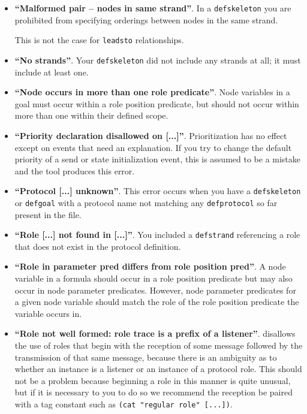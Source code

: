 \begin{itemize}
\item \textbf{``Malformed pair -- nodes in same strand''}.  In a \texttt{defskeleton}
  you are prohibited from specifying orderings between nodes in the same strand.

  This is not the case for \texttt{leadsto} relationships.

\item \textbf{``No strands''}.  Your \texttt{defskeleton} did not include
  any strands at all; it must include at least one.

\item \textbf{``Node occurs in more than one role predicate''}.  Node variables
  in a goal must occur within a role position predicate, but should not occur within
  more than one within their defined scope.

\item \textbf{``Priority declaration disallowed on [...]''}.  Prioritization
  has no effect except on events that need an explanation.  If you try to
  change the default priority of a send or state initialization event, this
  is assumed to be a mistake and the tool produces this error.

\item \textbf{``Protocol [...] unknown''}.  This error occurs when you
  have a \texttt{defskeleton} or \texttt{defgoal} with a protocol name
  not matching any \texttt{defprotocol} so far present in the file.

\item \textbf{``Role [...] not found in [...]''}.  You included a
  \texttt{defstrand} referencing a role that does not exist in the
  protocol definition.

\item \textbf{``Role in parameter pred differs from role position
  pred''}.  A node variable in a formula should occur in a role
  position predicate but may also occur in node parameter predicates.
  However, node parameter predicates for a given node variable should
  match the role of the role position predicate the variable occurs
  in.

\item \textbf{``Role not well formed: role trace is a prefix of a listener''}.  {\cpsa}
  disallows the use of roles that begin with the reception of some
  message followed by the transmission of that same message, because
  there is an ambiguity as to whether an instance is a listener or an
  instance of a protocol role.  This should not be a problem because
  beginning a role in this manner is quite unusual, but if it is
  necessary to you to do so we recommend the reception be paired with
  a tag constant such as \texttt{(cat "regular role" [...])}.


\end{itemize}
